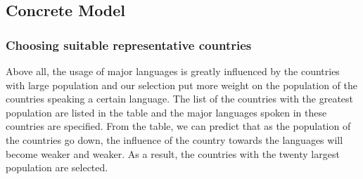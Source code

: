 \documentclass{mcmthesis}
\begin{document}
\subsection{Concrete Model}
\subsubsection{Choosing suitable representative countries}
Above all, the usage of major languages is greatly influenced by the countries with large population and our selection put more weight on the population of the countries speaking a certain language. The list of the countries with the greatest population are listed in the table and the major languages spoken in these countries are specified. From the table, we can predict that as the population of the countries go down, the influence of the country towards the languages will become weaker and weaker. As a result, the countries with the twenty largest population are selected.
\end{document}
